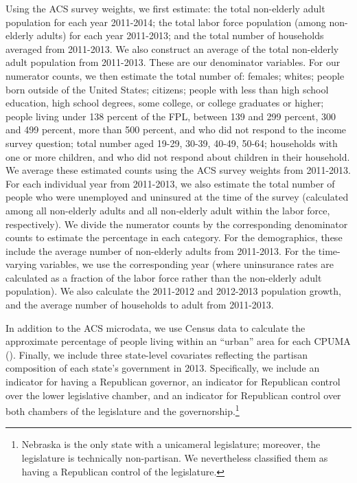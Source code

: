 \documentclass[12pt]{article}
\begin{document}
Using the ACS survey weights, we first estimate: the total non-elderly adult population for each year 2011-2014; the total labor force population (among non-elderly adults) for each year 2011-2013; and the total number of households averaged from 2011-2013. We also construct an average of the total non-elderly adult population from 2011-2013. These are our denominator variables. For our numerator counts, we then estimate the total number of: females; whites; people born outside of the United States; citizens; people with less than high school education, high school degrees, some college, or college graduates or higher; people living under 138 percent of the FPL, between 139 and 299 percent, 300 and 499 percent, more than 500 percent, and who did not respond to the income survey question; total number aged 19-29, 30-39, 40-49, 50-64; households with one or more children, and who did not respond about children in their household. We average these estimated counts using the ACS survey weights from 2011-2013. For each individual year from 2011-2013, we also estimate the total number of people who were unemployed and uninsured at the time of the survey (calculated among all non-elderly adults and all non-elderly adult within the labor force, respectively). We divide the numerator counts by the corresponding denominator counts to estimate the percentage in each category. For the demographics, these include the average number of non-elderly adults from 2011-2013. For the time-varying variables, we use the corresponding year (where uninsurance rates are calculated as a fraction of the labor force rather than the non-elderly adult population). We also calculate the 2011-2012 and 2012-2013 population growth, and the average number of households to adult from 2011-2013. 

In addition to the ACS microdata, we use Census data to calculate the approximate percentage of people living within an ``urban'' area for each CPUMA (\cite{census}). Finally, we include three state-level covariates reflecting the partisan composition of each state's government in 2013. Specifically, we include an indicator for having a Republican governor, an indicator for Republican control over the lower legislative chamber, and an indicator for Republican control over both chambers of the legislature and the governorship.\footnote{Nebraska is the only state with a unicameral legislature; moreover, the legislature is technically non-partisan. We nevertheless classified them as having a Republican control of the legislature.} 
\end{document}
